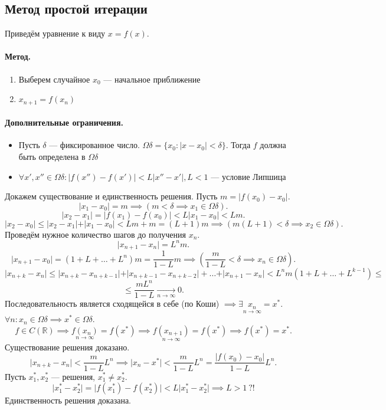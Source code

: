 \subsection{Метод простой итерации}
Приведём уравнение к виду $x = f(x)$.
\paragraph{Метод.} \begin{enumerate}
\item Выберем случайное $x_0$ --- начальное приближение
\item $x_{n+1} = f(x_n)$
\end{enumerate}
\paragraph{Дополнительные ограничения.} \begin{itemize}
\item Пусть $\delta$ --- фиксированное число. $\Omega\delta = \{x_0: \vert x - x_0 \vert < \delta \}$. Тогда $f$ должна быть определена в $\Omega \delta$
\item $\forall x', x'' \in \Omega\delta: \vert f(x'') - f(x') \vert < L\vert x'' - x' \vert, L < 1$ --- условие Липшица
\end{itemize}
Докажем существование и единственность решения.
Пусть $m = \vert f(x_0) - x_0 \vert$.
\[
	\vert x_1 - x_0\vert = m \implies (m < \delta \implies x_1 \in \Omega\delta).
\]
\[
	\vert x_2 - x_1\vert = \vert f(x_1) - f(x_0) \vert < L \vert x_1 - x_0 \vert < Lm.
\]
\[
	\vert x_2 - x_0\vert \leq \vert x_2 - x_1 \vert + \vert x_1 - x_0 \vert < Lm + m = (L + 1)m \implies (m(L+1) < \delta \implies x_2 \in \Omega\delta).
\]
Проведём нужное количество шагов до получения $x_n$.
\[
	\vert x_{n+1} - x_n \vert = L^n m.
\]
\[
	\vert x_{n+1} - x_0\vert = (1+L+\hdots+L^n)m = \frac{1}{1-L}m \implies (\frac{m}{1-L} < \delta \implies x_n \in \Omega \delta).
\]
\[
	\vert x_{n+k}-x_n\vert \leq \vert x_{n+k} - x_{n+k-1}\vert + \vert x_{n+k-1} - x_{n+k-2}\vert + \hdots + \vert x_{n+1} - x_n \vert < L^n m (1+L+\hdots+L^{k-1}) \leq
\]
\[
	\leq \frac{mL^n}{1-L} \underset{n \to \infty}{\longrightarrow} 0.
\]
Последовательность является сходящейся в себе (по Коши) $\implies \exists \underset{n \to \infty}{x_n} = x^*$.
$\forall n: x_n \in \Omega\delta \implies x^* \in \Omega\delta$.
\[
	f \in C(\mathbb{R}) \implies \underset{n\to\infty}{f(x_n)}=f(x^*)\implies\underset{n\to\infty}{f(x_{n+1})}=f(x^*)\implies f(x^*)=x^*.
\]
Существование решения доказано.
\[
	\vert x_{n+k} - x_n \vert < \frac{m}{1-L}L^n\implies \vert x_n - x^*\vert < \frac{m}{1-L}L^n = \frac{\vert f(x_0)-x_0\vert}{1-L}L^n.
\]
Пусть $x_1^*, x_2^*$ --- решения, $x_1^* \neq x_2^*$.
\[
	\vert x_1^* - x_2^* \vert = \vert f(x_1^*) - f(x_2^*)\vert < L\vert x_1^* - x_2^* \vert \implies L > 1 \ ?!
\]
Единственность решения доказана.
